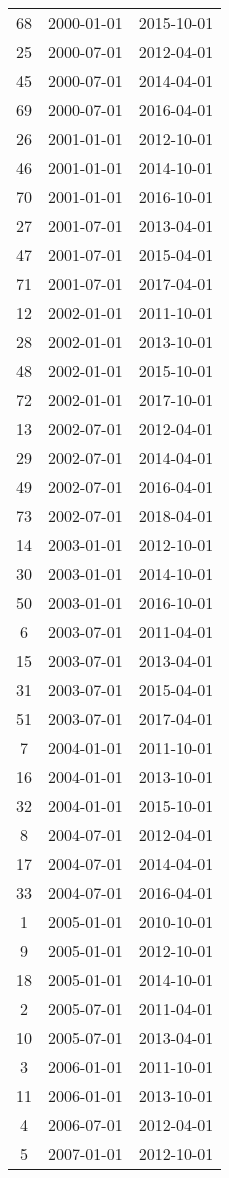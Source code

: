 \begin{tabular}{ccc}
  68 & 2000-01-01 & 2015-10-01 \\ 
  25 & 2000-07-01 & 2012-04-01 \\ 
  45 & 2000-07-01 & 2014-04-01 \\ 
  69 & 2000-07-01 & 2016-04-01 \\ 
  26 & 2001-01-01 & 2012-10-01 \\ 
  46 & 2001-01-01 & 2014-10-01 \\ 
  70 & 2001-01-01 & 2016-10-01 \\ 
  27 & 2001-07-01 & 2013-04-01 \\ 
  47 & 2001-07-01 & 2015-04-01 \\ 
  71 & 2001-07-01 & 2017-04-01 \\ 
  12 & 2002-01-01 & 2011-10-01 \\ 
  28 & 2002-01-01 & 2013-10-01 \\ 
  48 & 2002-01-01 & 2015-10-01 \\ 
  72 & 2002-01-01 & 2017-10-01 \\ 
  13 & 2002-07-01 & 2012-04-01 \\ 
  29 & 2002-07-01 & 2014-04-01 \\ 
  49 & 2002-07-01 & 2016-04-01 \\ 
  73 & 2002-07-01 & 2018-04-01 \\ 
  14 & 2003-01-01 & 2012-10-01 \\ 
  30 & 2003-01-01 & 2014-10-01 \\ 
  50 & 2003-01-01 & 2016-10-01 \\ 
  6 & 2003-07-01 & 2011-04-01 \\ 
  15 & 2003-07-01 & 2013-04-01 \\ 
  31 & 2003-07-01 & 2015-04-01 \\ 
  51 & 2003-07-01 & 2017-04-01 \\ 
  7 & 2004-01-01 & 2011-10-01 \\ 
  16 & 2004-01-01 & 2013-10-01 \\ 
  32 & 2004-01-01 & 2015-10-01 \\ 
  8 & 2004-07-01 & 2012-04-01 \\ 
  17 & 2004-07-01 & 2014-04-01 \\ 
  33 & 2004-07-01 & 2016-04-01 \\ 
  1 & 2005-01-01 & 2010-10-01 \\ 
  9 & 2005-01-01 & 2012-10-01 \\ 
  18 & 2005-01-01 & 2014-10-01 \\ 
  2 & 2005-07-01 & 2011-04-01 \\ 
  10 & 2005-07-01 & 2013-04-01 \\ 
  3 & 2006-01-01 & 2011-10-01 \\ 
  11 & 2006-01-01 & 2013-10-01 \\ 
  4 & 2006-07-01 & 2012-04-01 \\ 
  5 & 2007-01-01 & 2012-10-01 \\ 
   \hline
\end{tabular}
